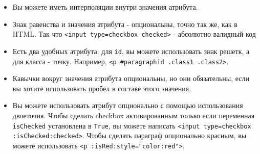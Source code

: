 \begin{itemize}
\item Вы можете иметь интерполяции внутри значения атрибута. 
\item Знак равенства и значения атрибута - опциональны, точно так же, как в HTML.
Так что \lstinline!<input type=checkbox checked>! - абсолютно валидный код
\item Есть два удобных атрибута: для \lstinline!id!, вы можете использовать знак 
решетк, а для класса - точку. Например, \lstinline!<p #paragraphid .class1 .class2>!.
\item Кавычки вокруг значения атрибута опциональны, но они обязательны, если вы
хотите использовать пробел в составе этого значения.
\item Вы можете использовать атрибут опционально с помощью использования двоеточия.
Чтобы сделать checkbox активированным только если переменная \lstinline!isChecked!
установлена в \lstinline!True!, вы можете написать
\lstinline!<input type=checkbox :isChecked:checked>!.
Чтобы сделать параграф опционально красным, вы можете использовать
\lstinline!<p :isRed:style="color:red">!.
\end{itemize}





